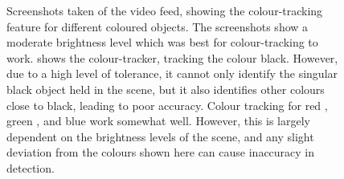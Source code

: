 \documentclass{l4proj}
\begin{document}
\begin{appendices}
\begin{figure}[!ht]
\begin{subfigure}{0.49\textwidth}
    \end{subfigure}
    \caption{Screenshots taken of the video feed, showing the colour-tracking feature for different coloured objects. The screenshots show a moderate brightness level which was best for colour-tracking to work.  shows the colour-tracker, tracking the colour black. However, due to a high level of tolerance, it cannot only identify the singular black object held in the scene, but it also identifies other colours close to black, leading to poor accuracy. Colour tracking for red , green , and blue  work somewhat well. However, this is largely dependent on the brightness levels of the scene, and any slight deviation from the colours shown here can cause inaccuracy in detection.}
    \label{fig:colour-tracking}
\end{figure}



\end{appendices}
\end{document}
